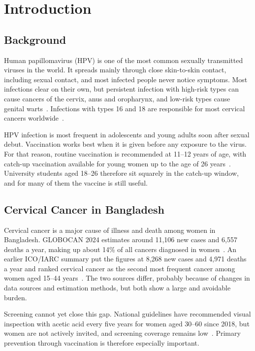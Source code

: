 \chapter{Introduction}

\section{Background}
Human papillomavirus (HPV) is one of the most common sexually transmitted viruses in the world. It spreads mainly through close skin-to-skin contact, including sexual contact, and most infected people never notice symptoms. Most infections clear on their own, but persistent infection with high-risk types can cause cancers of the cervix, anus and oropharynx, and low-risk types cause genital warts~\cite{markowitz2014}. Infections with types 16 and 18 are responsible for most cervical cancers worldwide~\cite{bruni2023}.

HPV infection is most frequent in adolescents and young adults soon after sexual debut. Vaccination works best when it is given before any exposure to the virus. For that reason, routine vaccination is recommended at 11--12 years of age, with catch-up vaccination available for young women up to the age of 26 years~\cite{markowitz2014}. University students aged 18--26 therefore sit squarely in the catch-up window, and for many of them the vaccine is still useful.

\section{Cervical Cancer in Bangladesh}
Cervical cancer is a major cause of illness and death among women in Bangladesh. GLOBOCAN 2024 estimates around 11,106 new cases and 6,557 deaths a year, making up about 14\% of all cancers diagnosed in women~\cite{iarc2024}. An earlier ICO/IARC summary put the figures at 8,268 new cases and 4,971 deaths a year and ranked cervical cancer as the second most frequent cancer among women aged 15--44 years~\cite{bruni2023}. The two sources differ, probably because of changes in data sources and estimation methods, but both show a large and avoidable burden.

Screening cannot yet close this gap. National guidelines have recommended visual inspection with acetic acid every five years for women aged 30--60 since 2018, but women are not actively invited, and screening coverage remains low~\cite{bruni2023}. Primary prevention through vaccination is therefore especially important.


